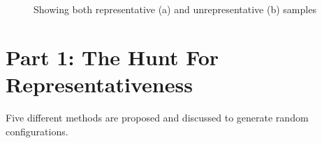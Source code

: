 \documentclass[a4paper,11pt]{report}
\newcommand{\figa}{
    \begin{figure}[!htpb]
    \centering
}
\newcommand{\figb}[2]{
    \caption{#1}
    \label{#2}
    \end{figure}
}
\begin{document}
\figa
\figb{Showing both representative (a) and unrepresentative (b) samples}{fig:reprrand}



        \section{Part 1: The Hunt For Representativeness}
        \label{rephunt}


Five different methods are proposed and discussed to generate random 
configurations.
\end{document}
